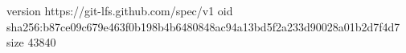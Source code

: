 version https://git-lfs.github.com/spec/v1
oid sha256:b87ce09c679e463f0b198b4b6480848ac94a13bd5f2a233d90028a01b2d7f4d7
size 43840
